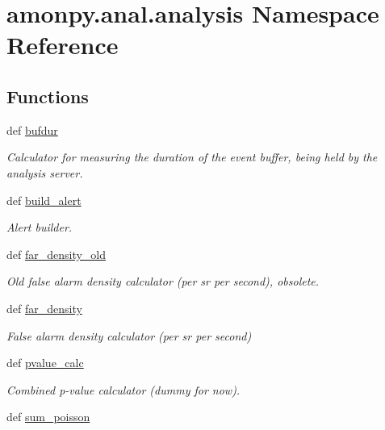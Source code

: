 \hypertarget{namespaceamonpy_1_1anal_1_1analysis}{\section{amonpy.\-anal.\-analysis Namespace Reference}
\label{namespaceamonpy_1_1anal_1_1analysis}
}
\subsection*{Functions}
\begin{DoxyCompactItemize}
\item 
def \hyperlink{namespaceamonpy_1_1anal_1_1analysis_aed5b550ff7cbb888d019157b065e2055}{bufdur}
\begin{DoxyCompactList}\small\item\em Calculator for measuring the duration of the event buffer, being held by the analysis server. \end{DoxyCompactList}\item 
def \hyperlink{namespaceamonpy_1_1anal_1_1analysis_ac3eb2116d918592df6e34c1519604e35}{build\-\_\-alert}
\begin{DoxyCompactList}\small\item\em Alert builder. \end{DoxyCompactList}\item 
def \hyperlink{namespaceamonpy_1_1anal_1_1analysis_a2354dd7fe7b31b5884dba6df4f126e17}{far\-\_\-density\-\_\-old}
\begin{DoxyCompactList}\small\item\em Old false alarm density calculator (per sr per second), obsolete. \end{DoxyCompactList}\item 
def \hyperlink{namespaceamonpy_1_1anal_1_1analysis_a8953e77d01e9caa5ca5e8e98307e400a}{far\-\_\-density}
\begin{DoxyCompactList}\small\item\em False alarm density calculator (per sr per second) \end{DoxyCompactList}\item 
def \hyperlink{namespaceamonpy_1_1anal_1_1analysis_a8fc861e2886ffe84d31493cd2acc42a9}{pvalue\-\_\-calc}
\begin{DoxyCompactList}\small\item\em Combined p-\/value calculator (dummy for now). \end{DoxyCompactList}\item 
def \hyperlink{namespaceamonpy_1_1anal_1_1analysis_a0c73147a4fe2f1a9d854d225e4d6a8f4}{sum\-\_\-poisson}

\end{DoxyCompactItemize}
